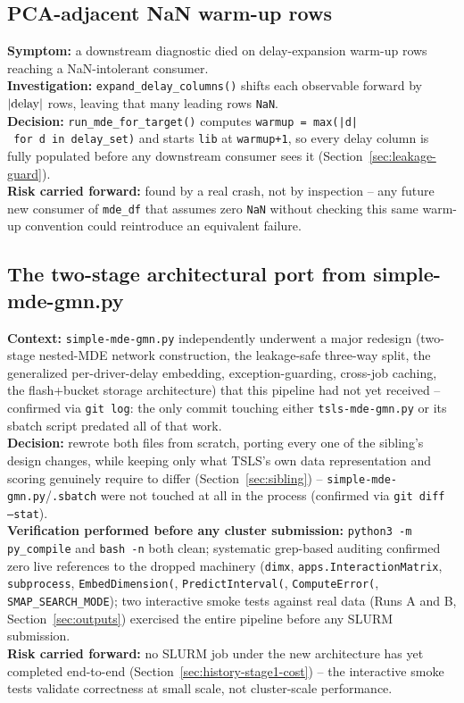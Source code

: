 \documentclass[11pt]{article}
\begin{document}
\subsection{PCA-adjacent NaN warm-up rows}
\label{sec:history-pca}
\textbf{Symptom:} a downstream diagnostic died on delay-expansion warm-up rows reaching a NaN-intolerant consumer.\\
\textbf{Investigation:} \texttt{expand\_delay\_columns()} shifts each observable forward by $|{\rm delay}|$ rows, leaving that many leading rows \texttt{NaN}.\\
\textbf{Decision:} \texttt{run\_mde\_for\_target()} computes \texttt{warmup = max(|d|\ for\ d\ in\ delay\_set)} and starts \texttt{lib} at \texttt{warmup+1}, so every delay column is fully populated before any downstream consumer sees it (Section~\ref{sec:leakage-guard}).\\
\textbf{Risk carried forward:} found by a real crash, not by inspection -- any future new consumer of \texttt{mde\_df} that assumes zero \texttt{NaN} without checking this same warm-up convention could reintroduce an equivalent failure.

\subsection{The two-stage architectural port from simple-mde-gmn.py}
\label{sec:history-port}
\textbf{Context:} \texttt{simple-mde-gmn.py} independently underwent a major redesign (two-stage nested-MDE network construction, the leakage-safe three-way split, the generalized per-driver-delay embedding, exception-guarding, cross-job caching, the flash+bucket storage architecture) that this pipeline had not yet received -- confirmed via \texttt{git log}: the only commit touching either \texttt{tsls-mde-gmn.py} or its sbatch script predated all of that work.\\
\textbf{Decision:} rewrote both files from scratch, porting every one of the sibling's design changes, while keeping only what TSLS's own data representation and scoring genuinely require to differ (Section~\ref{sec:sibling}) -- \texttt{simple-mde-gmn.py}/\texttt{.sbatch} were not touched at all in the process (confirmed via \texttt{git diff --stat}).\\
\textbf{Verification performed before any cluster submission:} \texttt{python3 -m py\_compile} and \texttt{bash -n} both clean; systematic grep-based auditing confirmed zero live references to the dropped machinery (\texttt{dimx}, \texttt{apps.InteractionMatrix}, \texttt{subprocess}, \texttt{EmbedDimension(}, \texttt{PredictInterval(}, \texttt{ComputeError(}, \texttt{SMAP\_SEARCH\_MODE}); two interactive smoke tests against real data (Runs A and B, Section~\ref{sec:outputs}) exercised the entire pipeline before any SLURM submission.\\
\textbf{Risk carried forward:} no SLURM job under the new architecture has yet completed end-to-end (Section~\ref{sec:history-stage1-cost}) -- the interactive smoke tests validate correctness at small scale, not cluster-scale performance.
\end{document}
